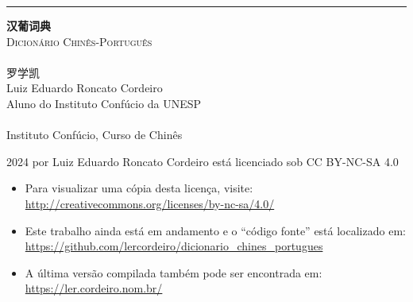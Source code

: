 \begin{titlingpage}
  \raggedleft
  \rule{1pt}{\textheight}
  \hspace{0.1\textwidth}
  \parbox[b]{0.75\textwidth}{
    \vspace{0.05\textheight}
    {\HUGE\bfseries 汉葡词典}\\[2\baselineskip] %
    {\Large\textsc{Dicionário Chinês-Português}\\%
     \large\textsc{\zhtoday}}\\%
    [4\baselineskip]
    {\Large\textsc{罗学凯}\\%
     \small Luiz Eduardo Roncato Cordeiro\\%
            Aluno do Instituto Confúcio da UNESP}\\%
    \vspace{0.5\textheight}\\%
    {Instituto Confúcio, Curso de Chinês}\\[\baselineskip] %
  }
  \newpage
  \raggedright
  \setlength{\parindent}{0pt}
  \setlength{\parskip}{\baselineskip}
  \mbox{}
  \vfill
  \footnotesize
  \textcopyright{} 2024 por Luiz Eduardo Roncato Cordeiro está licenciado sob CC BY-NC-SA 4.0\\
  \begin{itemize}
    \item Para visualizar uma cópia desta licença, visite:\\ \url{http://creativecommons.org/licenses/by-nc-sa/4.0/}
    \item Este trabalho ainda está em andamento e o ``código fonte'' está localizado em:\\ \url{https://github.com/lercordeiro/dicionario_chines_portugues}
    \item A última versão compilada também pode ser encontrada em:\\ \url{https://ler.cordeiro.nom.br/}
  \end{itemize}
\end{titlingpage}
